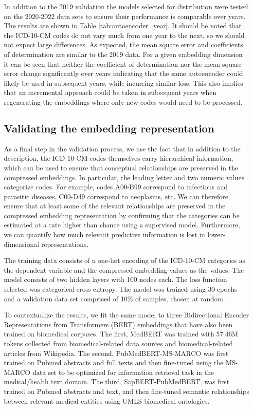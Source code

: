 \documentclass{bmcart}
\begin{document}
In addition to the 2019 validation the models selected for distribution were
tested on the 2020-2022 data sets to ensure their performance is comparable
over years. The results are shown in Table \ref{tab:autoencoder_year}. 
It should be noted that the ICD-10-CM codes do not vary much from
one year to the next, so we should not expect large differences. As 
expected, the mean square error and coefficients of determination are similar 
to the 2019 data. For a given embedding dimension it can be seen that neither
the coefficient of determination nor the mean square error change significantly 
over years indicating that the same autoencoder
could likely be used in subsequent years, while incurring similar loss. This 
also implies that an incremental approach could be taken in subsequent
years when regenerating the 
embeddings where only new codes would need to be processed.

\subsection*{Validating the embedding representation}

As a final step in the validation process, we use the fact that in addition to
the description, the ICD-10-CM codes themselves carry hierarchical information,
which can be used to ensure that conceptual relationships are preserved
in the compressed embeddings. In particular, the leading letter and two 
numeric values categorize codes. For example, codes A00-B99 correspond to
infectious and parasitic diseases, C00-D49 correspond to neoplasms, etc. We
can therefore ensure that at least some of the relevant relationships are 
preserved in the compressed embedding representation by confirming that
the categories can be estimated at a rate higher than chance using a 
supervised model. Furthermore, we can quantify how much relevant predictive
information is lost in lower-dimensional representations.

The training data consists of a one-hot encoding of the ICD-10-CM
categories as the dependent variable and the compressed embedding values as
the values. The model consists of two hidden layers with 100
nodes each. The loss function selected was categorical cross-entropy. The
model was trained using 30 epochs and a validation data set comprised of 10\% of
samples, chosen at random. 

To contextualize the results, we fit the same model to three 
Bidirectional Encoder Representations from Transformers (BERT) embeddings that
have also been trained on biomedical corpuses. The first, MedBERT \cite{medbert}
was trained with 57.46M tokens collected from biomedical-related data sources 
and biomedical-related articles from Wikipedia. The second, 
PubMedBERT-MS-MARCO \cite{pubmedbertqa} was first trained on Pubmed abstracts 
and full texts and then fine-tuned using the MS-MARCO data set \cite{msmarco} 
to be optimized for information retrieval task in the medical/health text 
domain. The third, SapBERT-PubMedBERT, was first trained on Pubmed abstracts 
and text, and then fine-tuned semantic relationships between relevant
medical entities using UMLS \cite{umls} biomedical ontologies.
\end{document}
